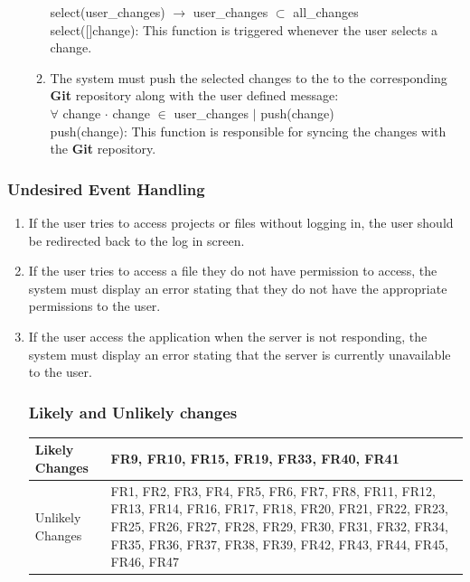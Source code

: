 \documentclass[12pt, titlepage]{article}
\begin{document}
\begin{enumerate}[{BE}1.]
\begin{enumerate}[resume*]
			select(user\_changes) $\rightarrow$ user\_changes $\subset$ all\_changes\\
			
			select([]change): This function is triggered whenever the user selects a change.\\
			
			\item The system must push the selected changes to the to the corresponding \textbf{Git} repository along with the user defined message:\\
			
			$\forall$ change $\cdot$ change $\in$ user\_changes $\vert$ push(change)\\
			
			push(change): This function is responsible for syncing the changes with the \textbf{Git} repository.\\
			
		\end{enumerate}
	\end{enumerate}
	
	\subsubsection{Undesired Event Handling}
	
	\begin{enumerate}[{UE}1.]
		\item If the user tries to access projects or files without logging in, the user should be redirected back to the log in screen.
		\item If the user tries to access a file they do not have permission to access, the system must display an error stating that they do not have the appropriate permissions to the user.
		\item If the user access the application when the server is not responding, the system must display an error stating that the server is currently unavailable to the user.
		
		\subsubsection{Likely and Unlikely changes}
		
		\begin{tabular}{|l | p{85mm} |}
			\hline
			Likely Changes & FR9, FR10, FR15, FR19, FR33, FR40, FR41  \\
			\hline
			Unlikely Changes & FR1, FR2, FR3, FR4, FR5, FR6, FR7, FR8, FR11, FR12, FR13, FR14, FR16, FR17, FR18, FR20, FR21, FR22, FR23, FR25, FR26, FR27, FR28, FR29, FR30, FR31, FR32, FR34, FR35, FR36, FR37, FR38, FR39, FR42, FR43, FR44, FR45, FR46, FR47 \\
			\hline
		\end{tabular}
		
	\end{enumerate}
	
\end{document}
